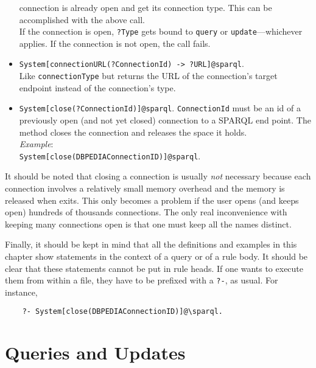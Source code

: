 \begin{itemize}
  connection is already open and get its connection type. This can be
  accomplished with the above call.
  \\
  If the connection is open, \texttt{?Type} gets bound to \texttt{query} or
  \texttt{update}---whichever applies. If the connection is not open, the
  call fails.   
\item \texttt{System[connectionURL(?ConnectionId) -> ?URL]@\bs{}sparql}.\\
  Like \texttt{connectionType} but returns the URL of the connection's 
  target endpoint instead of the connection's type.
\item  \texttt{System[close(?ConnectionId)]@\bs{}sparql}.
  \texttt{ConnectionId} must be an id of a previously open (and not yet
  closed) connection to a SPARQL end point.
  The method closes the connection and releases the space it holds.
  \\
  \emph{Example}:\\
  \texttt{System[close(DBPEDIAConnectionID)]@\bs{}sparql}. 
\end{itemize}

It should be noted that closing a connection is usually \emph{not} necessary
because each connection involves a relatively small memory overhead and the
memory is released when \ERGO exits.
This only becomes a problem if
the user opens (and keeps open) hundreds of thousands
connections. The only real inconvenience with keeping many connections open
is that one must keep all the names distinct.

Finally, it should be kept in mind
that all the definitions and examples in this chapter
show \ERGO statements in the context of a query or of a rule body. It should be
clear that these statements cannot be put in rule heads. If one wants to
execute them from within a file, they have to be prefixed with a
\texttt{?-}, as usual. For instance,
\begin{verbatim}
    ?- System[close(DBPEDIAConnectionID)]@\sparql.
\end{verbatim}



\section{Queries and Updates}


